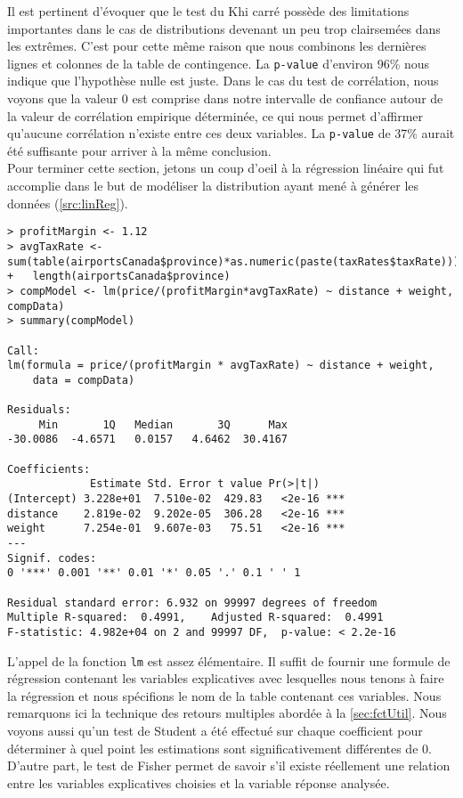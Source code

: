 \vspace{\baselineskip}
Il est pertinent d'évoquer que le test du Khi carré possède des limitations importantes dans le cas de distributions devenant un peu trop clairsemées dans les extrêmes. C'est pour cette même raison que nous combinons les dernières lignes et colonnes de la table de contingence. \cite{Rfunction:chisqWarning} La \texttt{p-value} d'environ 96\% nous indique que l'hypothèse nulle est juste. Dans le cas du test de corrélation, nous voyons que la valeur 0 est comprise dans notre intervalle de confiance autour de la valeur de corrélation empirique déterminée, ce qui nous permet d'affirmer qu'aucune corrélation n'existe entre ces deux variables. La \texttt{p-value} de 37\% aurait été suffisante pour arriver à la même conclusion. \\

Pour terminer cette section, jetons un coup d'oeil à la régression linéaire qui fut accomplie dans le but de modéliser la distribution ayant mené à générer les données (\autoref{src:linReg}).

\begin{lstlisting}[caption = Régression linéaire sur données empiriques,label=src:linReg]
> profitMargin <- 1.12
> avgTaxRate <- sum(table(airportsCanada$province)*as.numeric(paste(taxRates$taxRate)))/
+   length(airportsCanada$province)
> compModel <- lm(price/(profitMargin*avgTaxRate) ~ distance + weight, compData)
> summary(compModel)

Call:
lm(formula = price/(profitMargin * avgTaxRate) ~ distance + weight,
    data = compData)

Residuals:
     Min       1Q   Median       3Q      Max
-30.0086  -4.6571   0.0157   4.6462  30.4167

Coefficients:
             Estimate Std. Error t value Pr(>|t|)
(Intercept) 3.228e+01  7.510e-02  429.83   <2e-16 ***
distance    2.819e-02  9.202e-05  306.28   <2e-16 ***
weight      7.254e-01  9.607e-03   75.51   <2e-16 ***
---
Signif. codes:
0 '***' 0.001 '**' 0.01 '*' 0.05 '.' 0.1 ' ' 1

Residual standard error: 6.932 on 99997 degrees of freedom
Multiple R-squared:  0.4991,	Adjusted R-squared:  0.4991
F-statistic: 4.982e+04 on 2 and 99997 DF,  p-value: < 2.2e-16
\end{lstlisting}

\vspace{\baselineskip}
L'appel de la fonction \texttt{lm} \cite{Rfunction:lm} est assez élémentaire. Il suffit de fournir une formule de régression contenant les variables explicatives avec lesquelles nous tenons à faire la régression et nous spécifions le nom de la table contenant ces variables. Nous remarquons ici la technique des retours multiples abordée à la \autoref{sec:fctUtil}. Nous voyons aussi qu'un test de Student a été effectué sur chaque coefficient pour déterminer à quel point les estimations sont significativement différentes de 0. D'autre part, le test de Fisher permet de savoir s'il existe réellement une relation entre les variables explicatives choisies et la variable réponse analysée. \cite{outputLM} \\

